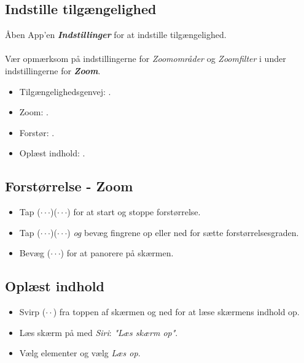 \documentclass[a4paper, landscape, 10pt]{scrartcl}
\begin{document}
\begin{multicols}{2}
\end{multicols}

\newpage
\hrulefill{}
\begin{multicols}{2}

\subsection*{Indstille tilgængelighed}
Åben App'en \textbf{\textit{Indstillinger}} for at indstille tilgængelighed. \\ \\
Vær opmærksom på indstillingerne for \emph{Zoomområder} og \emph{Zoomfilter} i under indstillingerne for \textbf{\emph{Zoom}}.
\begin{itemize}
  \item {Tilgængelighedsgenvej: .}
  \item {Zoom: .}
  \item {Forstør: .}
  \item {Oplæst indhold: .}
\end{itemize}

\subsection*{Forstørrelse - Zoom}
\begin{itemize}
  \item {Tap ($\cdot\cdot\cdot$)($\cdot\cdot\cdot$) for at start og stoppe forstørrelse.}
  \item {Tap ($\cdot\cdot\cdot$)($\cdot\cdot\cdot$) \emph{og} bevæg fingrene op eller ned for sætte forstørrelsesgraden.}
  \item {Bevæg ($\cdot\cdot\cdot$) for at panorere på skærmen.}
\end{itemize}

\subsection*{Oplæst indhold}
\begin{itemize}
  \item {Svirp ($\cdot\cdot$) fra toppen af skærmen og ned for at læse skærmens indhold op.}
  \item {Læs skærm på med \emph{Siri}: \textit{"Læs skærm op"}.}
  \item {Vælg elementer og vælg \emph{Læs op}.}
\end{itemize}


\end{multicols}
\end{document}
